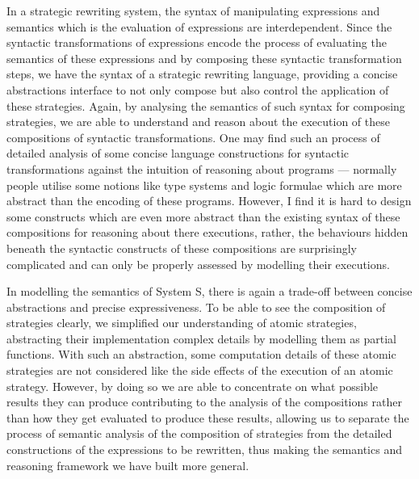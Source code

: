In a strategic rewriting system, the syntax of manipulating expressions and semantics which is the evaluation of expressions are interdependent. Since the syntactic transformations of expressions encode the process of evaluating the semantics of these expressions and by composing these syntactic transformation steps, we have the syntax of a strategic rewriting language, providing a concise abstractions interface to not only compose but also control the application of these strategies. Again, by analysing the semantics of such syntax for composing strategies, we are able to understand and reason about the execution of these compositions of syntactic transformations. One may find such an process of detailed analysis of some concise language constructions for syntactic transformations against the intuition of reasoning about programs --- normally people utilise some notions like type systems and logic formulae which are more abstract than the encoding of these programs. However, I find it is hard to design some constructs which are even more abstract than the existing syntax of these compositions for reasoning about there executions, rather, the behaviours hidden beneath the syntactic constructs of these compositions are surprisingly complicated and can only be properly assessed by modelling their executions. 

In modelling the semantics of System S, there is again a trade-off between concise abstractions and precise expressiveness. To be able to see the composition of strategies clearly, we simplified our understanding of atomic strategies, abstracting their implementation complex details by modelling them as partial functions. With such an abstraction, some computation details of these atomic strategies are not considered like the side effects of the execution of an atomic strategy. However, by doing so we are able to concentrate on what possible results they can produce contributing to the analysis of the compositions rather than how they get evaluated to produce these results, allowing us to separate the process of semantic analysis of the composition of strategies from the detailed constructions of the expressions to be rewritten, thus making the semantics and reasoning framework we have built more general.


